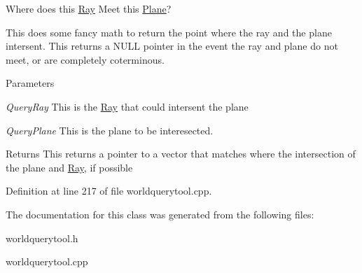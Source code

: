 Where does this \hyperlink{classphys_1_1Ray}{Ray} Meet this \hyperlink{classphys_1_1Plane}{Plane}? 

This does some fancy math to return the point where the ray and the plane intersent. This returns a NULL pointer in the event the ray and plane do not meet, or are completely coterminous. 
\begin{DoxyParams}{Parameters}
\item[{\em QueryRay}]This is the \hyperlink{classphys_1_1Ray}{Ray} that could intersent the plane \item[{\em QueryPlane}]This is the plane to be interesected. \end{DoxyParams}
\begin{DoxyReturn}{Returns}
This returns a pointer to a vector that matches where the intersection of the plane and \hyperlink{classphys_1_1Ray}{Ray}, if possible 
\end{DoxyReturn}


Definition at line 217 of file worldquerytool.cpp.



The documentation for this class was generated from the following files:\begin{DoxyCompactItemize}
\item 
worldquerytool.h\item 
worldquerytool.cpp\end{DoxyCompactItemize}
